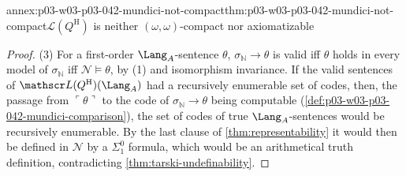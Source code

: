 \begin{annexitem}{annex:p03-w03-p03-042-mundici-not-compact}{thm:p03-w03-p03-042-mundici-not-compact}{\(\mathscr L(Q^{\mathrm H})\) is neither \((\omega,\omega)\)-compact nor axiomatizable}
\begin{proof}
(3) For a first-order \(\Lang_A\)-sentence \(\theta\), \(\sigma_{\mathbb
N}\to\theta\) is valid iff \(\theta\) holds in every model of
\(\sigma_{\mathbb N}\) iff \(\mathcal N\models\theta\), by (1) and
isomorphism invariance.  If the valid sentences of \(\mathscr
L(Q^{\mathrm H})(\Lang_A)\) had a recursively enumerable set of codes,
then, the passage from \(\ulcorner\theta\urcorner\) to the code of
\(\sigma_{\mathbb N}\to\theta\) being computable
(\cref{def:p03-w03-p03-042-mundici-comparison}), the set of codes of true
\(\Lang_A\)-sentences would be recursively enumerable.  By the last clause
of \cref{thm:representability} it would then be defined in \(\mathcal N\)
by a \(\Sigma^0_1\) formula, which would be an arithmetical truth
definition, contradicting \cref{thm:tarski-undefinability}.
\end{proof}
\end{annexitem}

